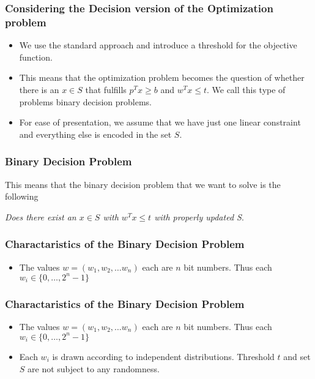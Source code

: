 \begin{frame}
    \frametitle{Considering the Decision version of the Optimization problem}

    \begin{itemize}
        \item We use the standard approach and introduce a threshold for the objective
              function.
        \item This means that the optimization problem becomes the question of whether there
              is an $x \in S$ that fulfills $p^T x \geq b$ and $ w^T x \leq t$. We call this
              type of problems binary decision problems.
        \item For ease of presentation, we assume that we have just one linear constraint and
              everything else is encoded in the set $S$.
    \end{itemize}

\end{frame}

\begin{frame}
    \frametitle{Binary Decision Problem}

    This means that the binary decision problem that we want to solve is the
    following

    \begin{center}
        \textit{Does there exist an $x \in S$ with $w^T x \leq t$ with properly updated S}.
    \end{center}

\end{frame}

\begin{frame}
    \frametitle{Charactaristics of the Binary Decision Problem}

    \begin{itemize}
        \item The values $w = (w_1, w_2, \dots w_n)$ each are $n$ bit numbers. Thus each $w_i
                  \in \{0, \dots, 2^n - 1\}$
    \end{itemize}

\end{frame}

\begin{frame}
    \frametitle{Charactaristics of the Binary Decision Problem}

    \begin{itemize}
        \item The values $w = (w_1, w_2, \dots w_n)$ each are $n$ bit numbers. Thus each $w_i
                  \in \{0, \dots, 2^n - 1\}$
        \item Each $w_i$ is drawn according to independent distributions. Threshold $t$ and
              set $S$ are not subject to any randomness.
    \end{itemize}

\end{frame}

